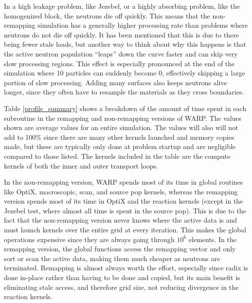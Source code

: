 In a high leakage problem, like Jezebel, or a highly absorbing problem, like the homogenized block, the neutrons die off quickly.  This means that the non-remapping simulation has a generally higher processing rate than problems where neutrons do not die off quickly.  It has been mentioned that this is due to there being fewer stale loads, but another way to think about why this happens is that the active neutron population ``leaps'' down the curve faster and can skip very slow processing regions.  This effect is especially pronounced at the end of the simulation where 10 particles can suddenly become 0, effectively skipping a large portion of slow processing.  Adding many surfaces also keeps neutrons alive longer, since they often have to resample the materials as they cross boundaries.  

Table \ref{profile_summary} shows a breakdown of the amount of time spent in each subroutine in the remapping and non-remapping versions of WARP.  The values shown are average values for an entire simulation.  The values will also will not add to 100\% since there are many other kernels launched and memory copies made, but these are typically only done at problem startup and are negligible compared to those listed.  The kernels included in the table are the compute kernels of both the inner and outer transport loops.  

In the non-remapping version, WARP spends most of its time in global routines like OptiX, macroscopic, scan, and source pop kernels, whereas the remapping version spends most of its time in OptiX and the reaction kernels (except in the Jezebel test, where almost all time is spent in the source pop).  This is due to the fact that the non-remapping version never knows where the active data is and must launch kernels over the entire grid at every iteration.  This makes the global operations expensive since they are always going through $10^6$ elements.  In the remapping version, the global functions access the remapping vector and only sort or scan the active data, making them much cheaper as neutrons are terminated.  Remapping is almost always worth the effort, especially since radix is done in-place rather than having to be done and copied, but its main benefit is eliminating stale access, and therefore grid size, not reducing divergence in the reaction kernels.  %



